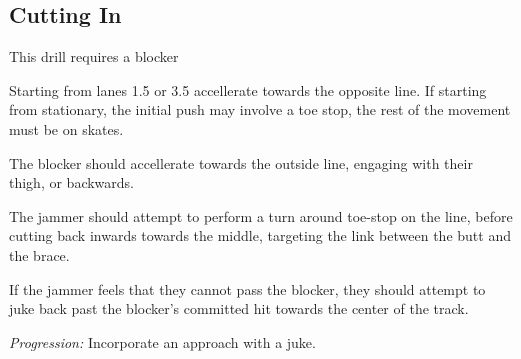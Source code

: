 \subsection*{Cutting In}
\label{drill:line_to_line_jamming:toe_stop_line_run}

This drill requires a blocker

Starting from lanes 1.5 or 3.5 accellerate towards the opposite line.
If starting from stationary, the initial push may involve a toe stop, the rest of the movement must be on skates.

The blocker should accellerate towards the outside line, engaging with their thigh, or backwards.

The jammer should attempt to perform a turn around toe-stop on the line, before cutting back inwards towards the middle, targeting the link between the butt and the brace.     


If the jammer feels that they cannot pass the blocker, they should attempt to juke back past the blocker's committed hit towards the center of the track.



%


{\it Progression:} Incorporate an approach with a juke.

